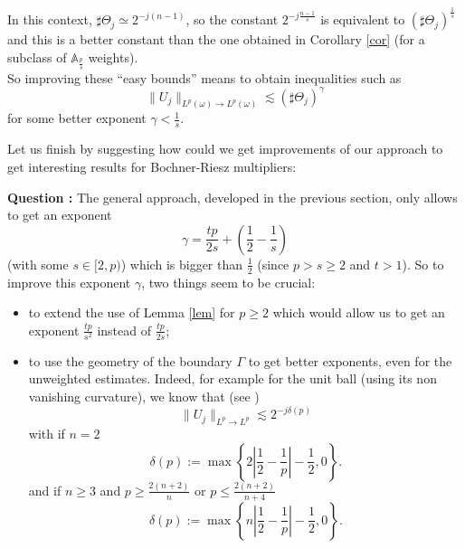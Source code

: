 \documentclass[11pt]{amsart}
\theoremstyle{remark}
\newcommand{\mb}{\medskip\noindent}
\newcommand{\gb}{\bigskip\noindent}
\begin{document}
\mb
In this context, $\sharp \Theta_j \simeq 2^{-j(n-1)}$, so the constant $2^{-j \frac{n-1}{s}}$ is equivalent to $(\sharp \Theta_j)^{\frac{1}{s}}$ and this is a better constant than the one obtained in Corollary \ref{cor} (for a subclass of ${\mathbb A}_{\frac{p}{s}}$ weights). \\
So improving these ``easy bounds'' means to obtain inequalities such as
$$ \| U_j\|_{L^p(\omega) \rightarrow L^p(\omega)} \lesssim (\sharp \Theta_j)^{\gamma}$$
for some better exponent $\gamma<\frac{1}{s}$.

\gb

Let us finish by suggesting how could we get improvements of our approach to get interesting results for Bochner-Riesz multipliers:

\mb
{\bf Question :} The general approach, developed in the previous section, only allows to get an exponent
$$ \gamma=\frac{tp}{2s}+\left(\frac{1}{2}-\frac{1}{s}\right)$$
(with some $s\in[2,p)$) which is bigger than $\frac{1}{2}$ (since $p>s\geq 2$ and $t>1$). 
So to improve this exponent $\gamma$, two things seem to be crucial: 
\begin{itemize}
 \item to extend the use of Lemma \ref{lem} for $p\geq 2$ which would allow us to get an exponent $\frac{tp}{s^2}$ instead of $\frac{tp}{2s}$;
 \item to use the geometry of the boundary $\Gamma$ to get better exponents, even for the unweighted estimates. Indeed, for example for the unit ball (using its non vanishing curvature), we know that (see \cite{Lee, survey})
$$ \|U_j\|_{L^p\to L^p} \lesssim 2^{-j\delta(p)}$$
with if $n=2$
$$ \delta(p):= \max\left\{ 2\left|\frac{1}{2}-\frac{1}{p}\right|-\frac{1}{2},0 \right\}.$$
and if $n\geq 3$ and $p\geq \frac{2(n+2)}{n}$ or $p\leq \frac{2(n+2)}{n+4}$
$$ \delta(p):= \max\left\{ n\left|\frac{1}{2}-\frac{1}{p}\right|-\frac{1}{2},0 \right\}.$$
\end{itemize}
\end{document}
